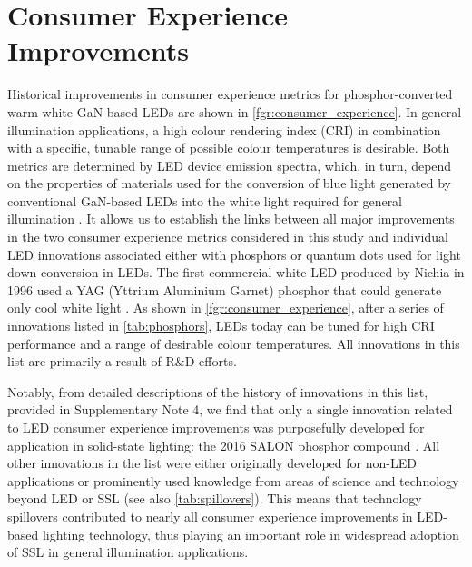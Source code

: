 \documentclass[parskip=full]{article}
\begin{document}
\section{Consumer Experience Improvements}

Historical improvements in consumer experience metrics for phosphor-converted warm white GaN-based LEDs are shown in \cref{fgr:consumer_experience}. In general illumination applications, a high colour rendering index (CRI) in combination with a specific, tunable range of possible colour temperatures is desirable. Both metrics are determined by LED device emission spectra, which, in turn, depend on the properties of materials used for the conversion of blue light generated by conventional GaN-based LEDs into the white light required for general illumination . It allows us to establish the links between all major improvements in the two consumer experience metrics considered in this study and individual LED innovations  associated either with phosphors or quantum dots used for light down conversion in LEDs. The first commercial white LED produced by Nichia in 1996 used a YAG (Yttrium Aluminium Garnet) phosphor that could generate only cool white light \cite{bando1998development}. As shown in \cref{fgr:consumer_experience}, after a series of innovations listed in \cref{tab:phosphors}, LEDs today can be tuned for high CRI performance and a range of desirable colour temperatures. All innovations in this list are primarily a result of R\&D efforts.

Notably, from detailed descriptions of the history of innovations in this list, provided in Supplementary Note 4, we find that only a single innovation related to LED consumer experience improvements was purposefully developed for application in solid-state lighting: the 2016 SALON phosphor compound \cite{Hoerder2019,seibald2019phosphor}. All other innovations in the list were either originally developed for non-LED applications or prominently used knowledge from areas of science and technology beyond LED or SSL (see also \cref{tab:spillovers}). This means that technology spillovers contributed to nearly all consumer experience improvements in LED-based lighting technology, thus playing an important role in widespread adoption of SSL in general illumination applications. 
\end{document}
